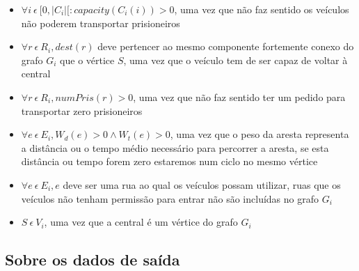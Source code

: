 \documentclass[article, a4paper, 12pt, oneside]{memoir}
\begin{document}
\begin{itemize}
	\item $\forall i ~ \epsilon ~ [0, \vert C_i \vert [: capacity(C_i(i)) > 0$, uma vez que não faz sentido os veículos não poderem transportar prisioneiros
	\item $\forall r ~ \epsilon ~ R_i, dest(r)$ deve pertencer ao mesmo componente fortemente conexo do grafo $G_i$ que o vértice $S$, uma vez que o veículo tem de ser capaz de voltar à central
	\item $\forall r ~ \epsilon ~ R_i, numPris(r) > 0$, uma vez que não faz sentido ter um pedido para transportar zero prisioneiros
	\item $\forall e ~ \epsilon ~ E_i, W_d(e) > 0 \wedge W_t(e) > 0$, uma vez que o peso da aresta representa a distância ou o tempo médio necessário para percorrer a aresta, se esta distância ou tempo forem zero estaremos num ciclo no mesmo vértice
	\item $\forall e ~ \epsilon ~ E_i, e$ deve ser uma rua ao qual os veículos possam utilizar, ruas que os veículos não tenham permissão para entrar não são incluídas no grafo $G_i$
	\item $S ~ \epsilon ~ V_i$, uma vez que a central é um vértice do grafo $G_i$
\end{itemize}

\subsection{Sobre os dados de saída}
\end{document}
